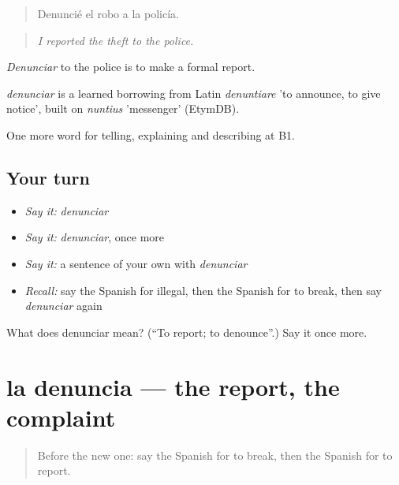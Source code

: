\begin{quote}
Denuncié el robo a la policía.
\end{quote}

\begin{quote}
\emph{I reported the theft to the police.}
\end{quote}

\emph{Denunciar} to the police is to make a formal report.

\begin{cousinweb}
\emph{denunciar} is a learned borrowing from Latin \emph{denuntiare} 'to announce, to give notice', built on \emph{nuntius} 'messenger' (EtymDB).
\end{cousinweb}

\begin{grammarlens}[title={What you've built}]
One more word for telling, explaining and describing at B1.
\end{grammarlens}

\subsection*{Your turn}
\begin{itemize}
\raggedright
  \item \emph{Say it:} \emph{denunciar}
  \item \emph{Say it:} \emph{denunciar}, once more
  \item \emph{Say it:} a sentence of your own with \emph{denunciar}
  \item \emph{Recall:} say the Spanish for illegal, then the Spanish for to break, then say \emph{denunciar} again
\end{itemize}

\begin{tcolorbox}[breakable,colback=teal!4,colframe=teal!35!black,title={Before you move on}]
What does denunciar mean? (\textquotedblleft{}To report; to denounce\textquotedblright{}.) Say it once more.
\end{tcolorbox}
\section[la denuncia]{la denuncia — the report, the complaint}

\label{lesson:ES-C625-denuncia}



\begin{quote}
Before the new one: say the Spanish for to break, then the Spanish for to report.
\end{quote}

